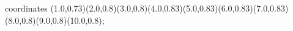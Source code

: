 					coordinates { (1.0,0.73)(2.0,0.8)(3.0,0.8)(4.0,0.83)(5.0,0.83)(6.0,0.83)(7.0,0.83)(8.0,0.8)(9.0,0.8)(10.0,0.8)};